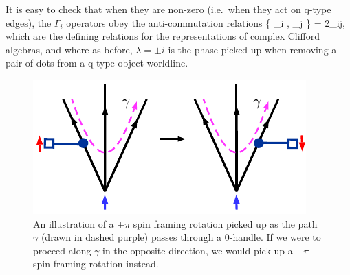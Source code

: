 


It is easy to check that when they are non-zero (i.e.\ when they act on q-type edges), the $\Gamma_i$ operators obey the anti-commutation relations 
\be \{ \Gamma_i , \Gamma_j \} = 2\lambda \delta_{ij},\ee
which are the defining relations for the representations of complex Clifford algebras, and where as before, $\lambda=\pm i$ is the phase picked up when removing a pair of dots from a q-type object worldline. 


\medskip

\begin{figure}
\begin{center}
\includegraphics{spin_rot_through_0handle.pdf}
\caption{ \label{spin_rot_through_0handle} An illustration of a $+\pi$ spin framing rotation picked up as the path $\gamma$ (drawn in dashed purple) passes through a 0-handle. 
If we were to proceed along $\gamma$ in the opposite direction, we would pick up a $-\pi$ spin framing rotation instead.   }
\end{center}
\end{figure}

